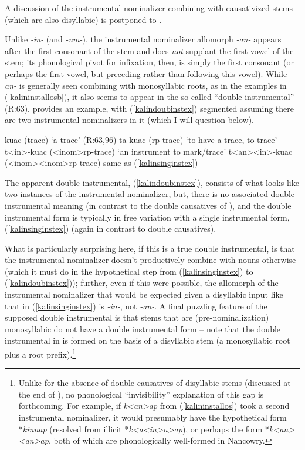 \documentclass[output=paper]{langscibook}
\begin{document}
\noindent A discussion of the instrumental nominalizer combining with causativized stems (which are also disyllabic) is postponed to .

Unlike \textit{-in-} (and \textit{-um-}), the instrumental nominalizer allomorph \textit{-an-} appears after the first consonant of the stem and does \textit{not} supplant the first vowel of the stem; its phonological pivot for infixation, then, is simply the first consonant (or perhaps the first vowel, but preceding rather than following this vowel). While \textit{-an-} is generally seen combining with monosyllabic roots, as in the examples in (\ref{kalininstallosb}), it also seems to appear in the so-called ``double instrumental'' (R:63). \Next provides an example, with (\ref{kalindoubinstex}) segmented assuming there are two instrumental nominalizers in it (which I will question below).%

\ea\label{kalindoubinst} 
\ea kuac (trace) \hfill `a trace' (R:63,96)
\ex ta-kuac ({\sc rp-}trace) \hfill `to have a trace, to trace'
\ex t<in>-kuac ({\sc <inom>rp-}trace)  \hfill `an instrument to mark/trace' \label{kalinsinginstex}
\ex t<an><in>-kuac ({\sc <inom><inom>rp-}trace)  \hfill same as (\ref{kalinsinginstex}) \label{kalindoubinstex}
\z
\z

\noindent The apparent double instrumental, (\ref{kalindoubinstex}), consists of what looks like two instances of the instrumental nominalizer, but, there is no associated double instrumental meaning (in contrast to the double causatives of ), and the double instrumental form is typically in free variation with a single instrumental form, (\ref{kalinsinginstex}) (again in contrast to double causatives).

What is particularly surprising here, if this is a true double instrumental, is that the instrumental nominalizer doesn't productively combine with nouns otherwise (which it must do in the hypothetical step from (\ref{kalinsinginstex}) to (\ref{kalindoubinstex})); further, even if this were possible, the allomorph of the instrumental nominalizer that would be expected given a disyllabic input like that in (\ref{kalinsinginstex}) is \textit{-in-}, not \textit{-an-}. A final puzzling feature of the supposed double instrumental is that stems that are (pre-nominalization) monosyllabic do not have a double instrumental form -- note that the double instrumental in \Last is formed on the basis of a disyllabic stem (a monosyllabic root plus a root prefix).\footnote{Unlike for the absence of double causatives of disyllabic stems (discussed at the end of ), no phonological ``invisibility'' explanation of this gap is forthcoming. For example, if \textit{k<an>ap} from (\ref{kalininstallos}) took a second instrumental nominalizer, it would presumably have the hypothetical form *\textit{kinnap} (resolved from illicit *\textit{k<a<in>n>ap}), or perhaps the form *\textit{k<an><an>ap}, both of which are  phonologically well-formed in Nancowry.}
\end{document}
